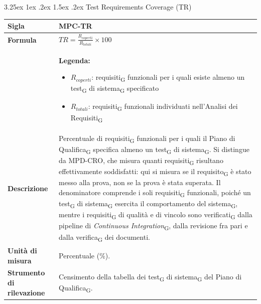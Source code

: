 \documentclass[a4paper, 10pt]{article}
\makeatletter
\renewcommand\paragraph{\@startsection{paragraph}{4}{\z@}%
  {3.25ex \@plus1ex \@minus .2ex}%
  {1.5ex \@plus .2ex}%
  {\normalfont\normalsize\bfseries}}
\makeatother
\begin{document}
\paragraph{Test Requirements Coverage (TR)}
\mbox{} \\
\noindent
\begin{minipage}{\textwidth}
    \begin{tabularx}{\textwidth}{|>{\columncolor{bluBitless!10}\bfseries}p{3.5cm}|X|}
        \hline
        Sigla & MPC-TR \\ \hline
        Formula &
        \textit{$TR = \frac{R_{coperti}}{R_{totali}} \times 100$} \vspace{2mm} \\
        & \small \textbf{Legenda:}
        \begin{itemize}
            \item $R_{coperti}$: requisiti\textsubscript{G} funzionali per i quali esiste almeno un test\textsubscript{G} di sistema\textsubscript{G} specificato
            \item $R_{totali}$: requisiti\textsubscript{G} funzionali individuati nell'Analisi dei Requisiti\textsubscript{G}
        \end{itemize} \\ \hline
        Descrizione & Percentuale di requisiti\textsubscript{G} funzionali per i quali il Piano di Qualifica\textsubscript{G} specifica almeno un test\textsubscript{G} di sistema\textsubscript{G}. Si distingue da MPD-CRO, che misura quanti requisiti\textsubscript{G} risultano effettivamente soddisfatti: qui si misura se il requisito\textsubscript{G} è stato messo alla prova, non se la prova è stata superata. Il denominatore comprende i soli requisiti\textsubscript{G} funzionali, poiché un test\textsubscript{G} di sistema\textsubscript{G} esercita il comportamento del sistema\textsubscript{G}, mentre i requisiti\textsubscript{G} di qualità e di vincolo sono verificati\textsubscript{G} dalla pipeline di \textit{Continuous Integration}\textsubscript{G}, dalla revisione fra pari e dalla verifica\textsubscript{G} dei documenti. \\ \hline
        Unità di misura & Percentuale (\%). \\ \hline
        Strumento di rilevazione & Censimento della tabella dei test\textsubscript{G} di sistema\textsubscript{G} del Piano di Qualifica\textsubscript{G}. \\ \hline
    \end{tabularx}
\end{minipage}
\end{document}
